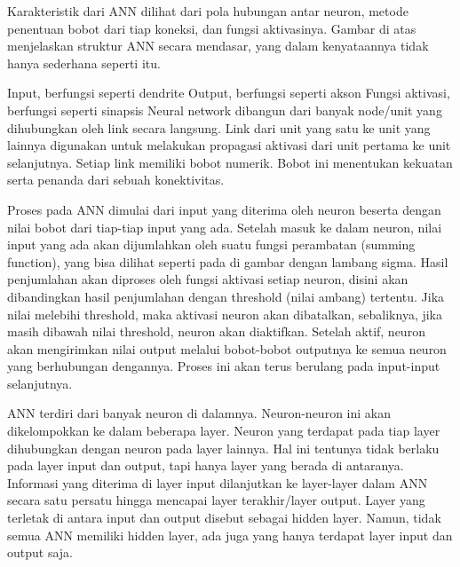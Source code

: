 Karakteristik dari ANN dilihat dari pola hubungan antar neuron, metode penentuan bobot dari tiap koneksi, dan fungsi aktivasinya. Gambar di atas menjelaskan struktur ANN secara mendasar, yang dalam kenyataannya tidak hanya sederhana seperti itu.

Input, berfungsi seperti dendrite
Output, berfungsi seperti akson
Fungsi aktivasi, berfungsi seperti sinapsis
Neural network dibangun dari banyak node/unit yang dihubungkan oleh link secara langsung. Link dari unit yang satu ke unit yang lainnya digunakan untuk melakukan propagasi aktivasi dari unit pertama ke unit selanjutnya. Setiap link memiliki bobot numerik. Bobot ini menentukan kekuatan serta penanda dari sebuah konektivitas.

Proses pada ANN dimulai dari input yang diterima oleh neuron beserta dengan nilai bobot dari tiap-tiap input yang ada. Setelah masuk ke dalam neuron, nilai input yang ada akan dijumlahkan oleh suatu fungsi perambatan (summing function), yang bisa dilihat seperti pada di gambar dengan lambang sigma. Hasil penjumlahan akan diproses oleh fungsi aktivasi setiap neuron, disini akan dibandingkan hasil penjumlahan dengan threshold (nilai ambang) tertentu. Jika nilai melebihi threshold, maka aktivasi neuron akan dibatalkan, sebaliknya, jika masih dibawah nilai threshold, neuron akan diaktifkan. Setelah aktif, neuron akan mengirimkan nilai output melalui bobot-bobot outputnya ke semua neuron yang berhubungan dengannya. Proses ini akan terus berulang pada input-input selanjutnya.

ANN terdiri dari banyak neuron di dalamnya. Neuron-neuron ini akan dikelompokkan ke dalam beberapa layer. Neuron yang terdapat pada tiap layer dihubungkan dengan neuron pada layer lainnya. Hal ini tentunya tidak berlaku pada layer input dan output, tapi hanya layer yang berada di antaranya. Informasi yang diterima di layer input dilanjutkan ke layer-layer dalam ANN secara satu persatu hingga mencapai layer terakhir/layer output. Layer yang terletak di antara input dan output disebut sebagai hidden layer. Namun, tidak semua ANN memiliki hidden layer, ada juga yang hanya terdapat layer input dan output saja.

